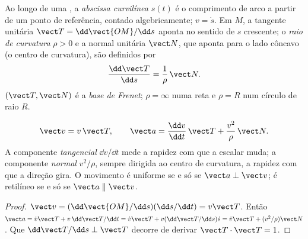 \begin{definition}\label{def:b1:point-kinematics:frenet}
Ao longo de uma , a \emph{abscissa curvilínea} $s(t)$ é o comprimento
de arco a partir de um ponto de referência, contado algebricamente; $v = \dot s$. Em
$M$, a tangente unitária $\vect T = \dd\vect{OM}/\dd s$ aponta no sentido de
$s$ crescente; o \emph{raio de curvatura} $\rho > 0$ e a normal
unitária $\vect N$, que aponta para o lado côncavo (o centro de
curvatura), são definidos por
\[
\frac{\dd\vect T}{\dd s} = \frac{1}{\rho}\,\vect N .
\]
$(\vect T, \vect N)$ é a \emph{base de Frenet}; $\rho = \infty$ numa
reta e $\rho = R$ num círculo de raio $R$.
\end{definition}

\begin{theorem}\label{thm:b1:point-kinematics:frenet}
\[
\vect v = v\,\vect T, \qquad
\vect a = \frac{\dd v}{\dd t}\,\vect T + \frac{v^2}{\rho}\,\vect N .
\]
A componente \emph{tangencial} $\dd v/\dd t$ mede a rapidez com que a
 escalar muda; a componente \emph{normal} $v^2/\rho$, sempre dirigida ao
centro de curvatura, a rapidez com que a direção gira. O movimento é
uniforme se e só se $\vect a \perp \vect v$; é retilíneo se e só se
$\vect a \parallel \vect v$.
\end{theorem}

\begin{proof}
$\vect v = (\dd\vect{OM}/\dd s)(\dd s/\dd t) = v\vect T$. Então $\vect a =
\dot v\vect T + v\,\dd\vect T/\dd t = \dot v\vect T + v(\dd\vect T/\dd s)\dot s
= \dot v\vect T + (v^2/\rho)\vect N$. Que $\dd\vect T/\dd s \perp \vect T$
decorre de derivar $\vect T\cdot\vect T = 1$.
\end{proof}

